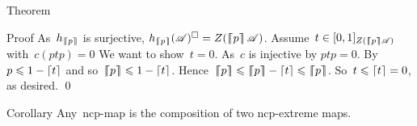 \documentclass[b]{subfiles}
\begin{document}
\begin{parsec}
\begin{point}{Theorem}
\begin{point}{Proof}
As~$h_{\left\lceil\!\!\left\lceil p\right\rceil\!\!\right\rceil}$ is surjective,
    $h_{\cceil{p}}(\scrA)^\square = Z(\cceil{p} \scrA)$.
    Assume~$t \in [0,1]_{Z(\left\lceil\!\!\left\lceil p\right\rceil\!\!\right\rceil \mathscr{A})}$ with~$c(ptp)=0$
We want to show~$t = 0$.
As~$c$ is injective by  $ptp = 0$.
By \TODO{} $p \leqslant 1- \left\lceil t\right\rceil$
and so~$\left\lceil\!\!\left\lceil p\right\rceil\!\!\right\rceil \leqslant 1- \left\lceil t\right\rceil$.
Hence~$\cceil{p} \leq \cceil{p} - \ceil{t} \leq \cceil{p}$.
So~$t \leqslant \left\lceil t \right\rceil=0$, as desired. \qed
\end{point}
\end{point}
\begin{point}{Corollary}%
    Any~ncp-map is the composition of two ncp-extreme maps.
\end{point}
\end{parsec}
\end{document}
